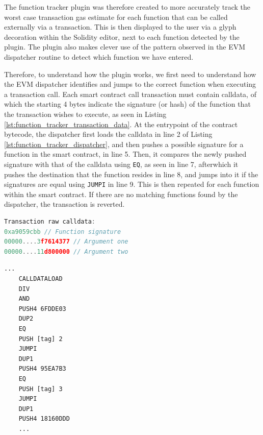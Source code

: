 The function tracker plugin was therefore created to more accurately track the worst case transaction gas 
estimate for each function that can be called externally via a transaction. This is then
displayed to the user via a glyph decoration within the Solidity editor, 
next to each function detected by the plugin.
The plugin also makes clever use of the pattern observed in the EVM dispatcher routine 
to detect which function we have entered.

Therefore, to understand how the plugin works, we first need to understand how the EVM dispatcher identifies and jumps 
to the correct function when executing a transaction call. Each smart contract call transaction 
must contain calldata, of which the starting 4 bytes indicate the signature (or hash) of the function
that the transaction wishes to execute, as seen in Listing \ref{lst:function_tracker_transaction_data}. 
At the entrypoint of the contract bytecode, the dispatcher first loads the calldata in line
2 of Listing \ref{lst:function_tracker_dispatcher}, and then pushes a possible signature for a function in the smart contract,
in line 5. Then, it compares the newly pushed signature with that of the calldata using \texttt{EQ}, 
as seen in line 7, afterwhich it pushes the destination that the function resides in line 8, and 
jumps into it if the signatures are equal using \texttt{JUMPI} in line 9. This is then repeated 
for each function within the smart contract. If there are no matching functions found 
by the dispatcher, the transaction is reverted.

\noindent\begin{minipage}{.45\textwidth}
\begin{lstlisting}[language=Javascript, caption={Transaction calldata}, label={lst:function_tracker_transaction_data}, basicstyle=\ttfamily\scriptsize]
Transaction raw calldata:
0xa9059cbb // Function signature
00000....3f7614377 // Argument one
00000....11d800000 // Argument two
\end{lstlisting}
\end{minipage}\hfill
\begin{minipage}{.45\textwidth}
  \begin{lstlisting}[language=EVM, caption={EVM dispatcher routine}, label={lst:function_tracker_dispatcher}, basicstyle=\ttfamily\scriptsize]
    ...
    CALLDATALOAD
    DIV
    AND
    PUSH4 6FDDE03
    DUP2
    EQ
    PUSH [tag] 2
    JUMPI
    DUP1
    PUSH4 95EA7B3
    EQ
    PUSH [tag] 3
    JUMPI
    DUP1
    PUSH4 18160DDD
    ...
  \end{lstlisting}
\end{minipage}

